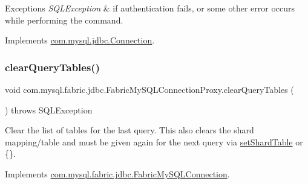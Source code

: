 \begin{DoxyExceptions}{Exceptions}
{\em S\+Q\+L\+Exception} & if authentication fails, or some other error occurs while performing the command. \\
\hline
\end{DoxyExceptions}


Implements \mbox{\hyperlink{interfacecom_1_1mysql_1_1jdbc_1_1_connection_a6a6160ecb2c19b5f246450ba9252907d}{com.\+mysql.\+jdbc.\+Connection}}.

\mbox{\label{classcom_1_1mysql_1_1fabric_1_1jdbc_1_1_fabric_my_s_q_l_connection_proxy_a797863b7d0a0798ce065d21b06a9f76d}} 
\subsubsection{\texorpdfstring{clear\+Query\+Tables()}{clearQueryTables()}}
{\footnotesize\ttfamily void com.\+mysql.\+fabric.\+jdbc.\+Fabric\+My\+S\+Q\+L\+Connection\+Proxy.\+clear\+Query\+Tables (\begin{DoxyParamCaption}{ }\end{DoxyParamCaption}) throws S\+Q\+L\+Exception}

Clear the list of tables for the last query. This also clears the shard mapping/table and must be given again for the next query via \mbox{\hyperlink{classcom_1_1mysql_1_1fabric_1_1jdbc_1_1_fabric_my_s_q_l_connection_proxy_a3dd3f50c8de7678f002bae64114643c3}{set\+Shard\+Table}} or \{\}. 

Implements \mbox{\hyperlink{interfacecom_1_1mysql_1_1fabric_1_1jdbc_1_1_fabric_my_s_q_l_connection_a50d57924d9cec195770ff2621425e36e}{com.\+mysql.\+fabric.\+jdbc.\+Fabric\+My\+S\+Q\+L\+Connection}}.

